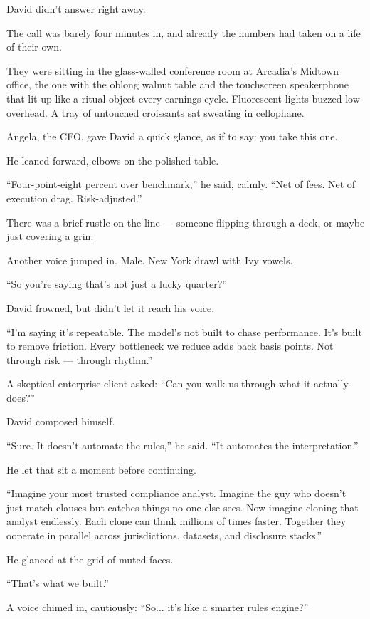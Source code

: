 David didn’t answer right away.

The call was barely four minutes in, and already the numbers had taken on a life of their own.

They were sitting in the glass-walled conference room at Arcadia’s Midtown office, the one with the oblong walnut table and the touchscreen speakerphone that lit up like a ritual object every earnings cycle. Fluorescent lights buzzed low overhead. A tray of untouched croissants sat sweating in cellophane.

Angela, the CFO, gave David a quick glance, as if to say: you take this one.

He leaned forward, elbows on the polished table.

“Four-point-eight percent over benchmark,” he said, calmly. “Net of fees. Net of execution drag. Risk-adjusted.”

There was a brief rustle on the line — someone flipping through a deck, or maybe just covering a grin.

Another voice jumped in. Male. New York drawl with Ivy vowels.

“So you’re saying that’s not just a lucky quarter?”

David frowned, but didn’t let it reach his voice.

“I’m saying it’s repeatable. The model’s not built to chase performance. It’s built to remove friction. 
Every bottleneck we reduce adds back basis points. Not through risk — through rhythm.”

A skeptical enterprise client asked: ``Can you walk us through what it actually does?''

David composed himself.

“Sure. It doesn’t automate the rules,” he said. “It automates the interpretation.”

He let that sit a moment before continuing.

``Imagine your most trusted compliance analyst. 
Imagine the guy who doesn’t just match clauses but catches things no one else sees. 
Now imagine cloning that analyst endlessly. 
Each clone can think millions of times faster. 
Together they ooperate in parallel across jurisdictions, datasets, and disclosure stacks.''

He glanced at the grid of muted faces.

``That’s what we built.''

A voice chimed in, cautiously: ``So... it’s like a smarter rules engine?''

